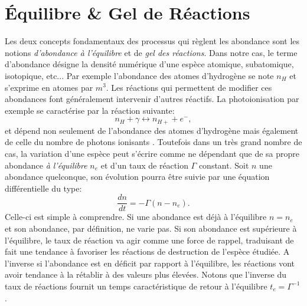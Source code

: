 \section{Équilibre \& Gel de Réactions}
Les deux concepts fondamentaux des processus qui règlent les abondance sont les notions \textit{d'abondance à l'équilibre} et de \textit{gel des réactions}. Dans notre cas, le terme d'abondance désigne la densité numérique d'une espèce atomique, subatomique, isotopique, etc... Par exemple l'abondance des atomes d'hydrogène se note $n_H$ et s'exprime en atomes par $m^3$. Les réactions qui permettent de modifier ces abondances font généralement intervenir d'autres réactifs. La photoionisation par exemple se caractérise par la réaction suivante:
\begin{equation}
n_H+\gamma \leftrightarrow n_{H+} + e^-,
\end{equation}
et dépend non seulement de l'abondance des atomes d'hydrogène mais également de celle du nombre de photons ionisants . Toutefois dans un très grand nombre de cas, la variation d'une espèce peut s'écrire comme ne dépendant que de sa propre abondance \textit{à l'équilibre} $n_e$ et d'un taux de réaction $\Gamma$ constant. Soit $n$ une abondance quelconque, son évolution pourra être suivie par une équation différentielle du type:
\begin{equation}
\frac{dn}{dt}=-\Gamma (n-n_e).
\end{equation}
Celle-ci est simple à comprendre. Si une abondance est déjà à l'équilibre $n=n_e$ et son abondance, par définition, ne varie pas. Si son abondance est supérieure à l'équilibre, le taux de réaction va agir comme une force de rappel, traduisant de fait une tendance à favoriser les réactions de destruction de l'espèce étudiée. A l'inverse si l'abondance est en déficit par rapport à l'équilibre, les réactions vont avoir tendance à la rétablir à des valeurs plus élevées. Notons que  l'inverse du taux de réactions fournit un temps caractéristique de retour à l'équilibre $t_e=\Gamma^{-1}$.


